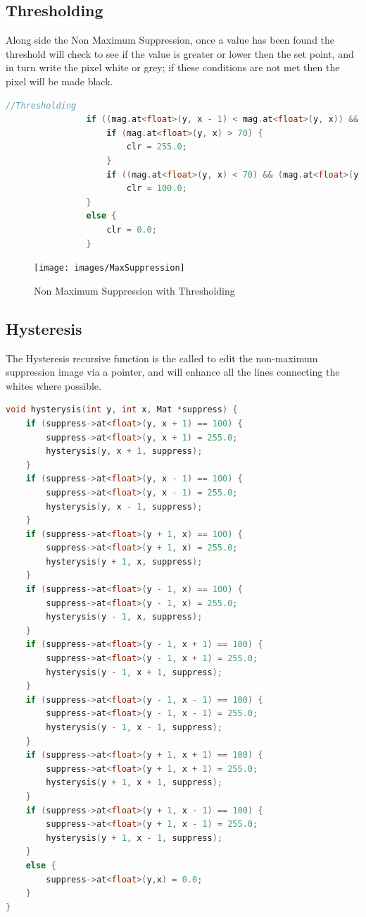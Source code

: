 \documentclass[a4paper, 10pt]{article}
\begin{document}
\clearpage
\subsection{Thresholding}

Along side the Non Maximum Suppression, once a value has been found the threshold will check to see if the value is greater or lower then the set point, and in turn write the pixel white or grey; if these conditions are not met then the pixel will be made black.

\begin{lstlisting}[language = C++]
				//Thresholding
				if ((mag.at<float>(y, x - 1) < mag.at<float>(y, x)) && (mag.at<float>(y, x) > mag.at<float>(y, x + 1))){
					if (mag.at<float>(y, x) > 70) {
						clr = 255.0;
					}
					if ((mag.at<float>(y, x) < 70) && (mag.at<float>(y, x) < 1))
						clr = 100.0;
				}
				else {
					clr = 0.0;
				}
\end{lstlisting}

\begin{figure}[H]
  \texttt{[image: images/MaxSuppression]}
  \caption{Non Maximum Suppression with Thresholding}
  \label{fig:Non Maximum Suppression with Thresholding}
\end{figure}


\clearpage
\subsection{Hysteresis}

The Hysteresis recursive function is the called to edit the non-maximum suppression image via a pointer, and will enhance all the lines connecting the whites where possible.

\begin{lstlisting}[language = C++]
void hysterysis(int y, int x, Mat *suppress) {
	if (suppress->at<float>(y, x + 1) == 100) {
		suppress->at<float>(y, x + 1) = 255.0;
		hysterysis(y, x + 1, suppress);
	}
	if (suppress->at<float>(y, x - 1) == 100) {
		suppress->at<float>(y, x - 1) = 255.0;
		hysterysis(y, x - 1, suppress);
	}
	if (suppress->at<float>(y + 1, x) == 100) {
		suppress->at<float>(y + 1, x) = 255.0;
		hysterysis(y + 1, x, suppress);
	}
	if (suppress->at<float>(y - 1, x) == 100) {
		suppress->at<float>(y - 1, x) = 255.0;
		hysterysis(y - 1, x, suppress);
	}
	if (suppress->at<float>(y - 1, x + 1) == 100) {
		suppress->at<float>(y - 1, x + 1) = 255.0;
		hysterysis(y - 1, x + 1, suppress);
	}
	if (suppress->at<float>(y - 1, x - 1) == 100) {
		suppress->at<float>(y - 1, x - 1) = 255.0;
		hysterysis(y - 1, x - 1, suppress);
	}
	if (suppress->at<float>(y + 1, x + 1) == 100) {
		suppress->at<float>(y + 1, x + 1) = 255.0;
		hysterysis(y + 1, x + 1, suppress);
	}
	if (suppress->at<float>(y + 1, x - 1) == 100) {
		suppress->at<float>(y + 1, x - 1) = 255.0;
		hysterysis(y + 1, x - 1, suppress);
	}
	else { 
		suppress->at<float>(y,x) = 0.0;
	}
}
\end{lstlisting}
\end{document}

